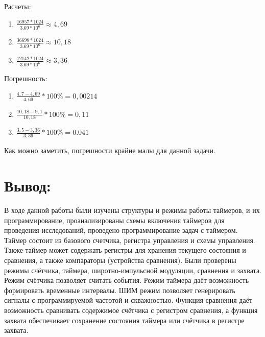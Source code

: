 \documentclass{bmstu}
\begin{document}
Расчеты: 
\begin{enumerate} [label=\arabic*)]
\item $\frac{16957*1024}{3.69*10^6} \approx 4,69$ 
\item $\frac{36698*1024}{3.69*10^6} \approx 10,18$ 
\item $\frac{12142*1024}{3.69*10^6} \approx 3,36$
\end{enumerate}
Погрешность: 
\begin{enumerate}[label=\arabic*)] 
\item $\frac{4,7-4,69}{4,69} * 100\% = 0,002 14$ 
\item $\frac{10,18-9,1}{10,18} * 100\% = 0,11 $
\item $\frac{3,5-3,36}{3,36} * 100\% = 0.041 $
\end{enumerate}

Как можно заметить, погрешности крайне малы для данной задачи.
\newline


\chapter{Вывод:}
В ходе данной работы были изучены структуры и режимы работы таймеров, и их программирование, проанализированы 
схемы включения таймеров для проведения исследований, проведено программирование задач с таймером. Таймер состоит 
из базового счетчика, регистра управления и схемы управления. Также таймер может содержать регистры для хранения 
текущего состояния и сравнения, а также компараторы (устройства сравнения). Были проверены режимы счётчика, 
таймера, широтно-импульсной модуляции, сравнения и захвата. Режим счётчика позволяет считать события. Режим 
таймера даёт возможность формировать временные интервалы. ШИМ режим позволяет генерировать сигналы с 
программируемой частотой и скважностью. Функция сравнения даёт возможность сравнивать содержимое счётчика с 
регистром сравнения, а функция захвата обеспечивает сохранение состояния таймера или счётчика в регистре захвата.
\end{document}
